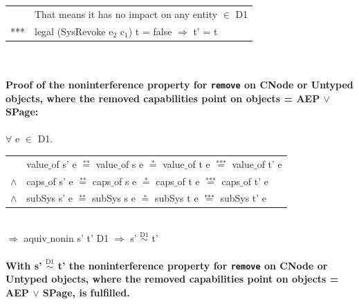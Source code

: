 \documentclass[11pt,a4paper,twoside]{article}
\begin{document}
{\begin{itemize}
\begin{tabular}{ll}
& That means it has no impact on any entity $\in$ D1 \\ 
*** & legal (SysRevoke e$_2$ c$_1$) t = false $\Rightarrow$ t' = t
\end{tabular} \\ \\ 
\textbf{Proof of the noninterference property for \texttt{remove} on CNode or Untyped objects, where the removed capabilities point on objects = AEP $\vee$ SPage:}\\ \\
$\forall$ e $\in$ D1. \\
\begin{tabular}{ll}
& value$\_$of s' e $\overset{\text{**}}{=}$ value$\_$of s e $\overset{\text{*}}{=}$ value$\_$of t e $\overset{\text{***}}{=}$ value$\_$of t' e \\
$\wedge$ & caps$\_$of s' e $\overset{\text{**}}{=}$ caps$\_$of s e $\overset{\text{*}}{=}$ caps$\_$of t e $\overset{\text{***}}{=}$ caps$\_$of t' e \\
$\wedge$ & subSys s' e $\overset{\text{**}}{=}$ subSys s e $\overset{\text{*}}{=}$ subSys t e $\overset{\text{***}}{=}$ subSys t' e
\end{tabular} \\
$\Rightarrow$ aquiv$\_$nonin s' t' D1 $\Rightarrow$ s' $\overset{\text{D1}}{\sim}$ t' \\ \\
\textbf{With s' $\overset{\text{D1}}{\sim}$ t' the noninterference property for \texttt{remove} on CNode or Untyped objects, where the removed capabilities point on objects = AEP $\vee$ SPage, is fulfilled.}  
\clearpage
\end{itemize}
}
\end{document}
